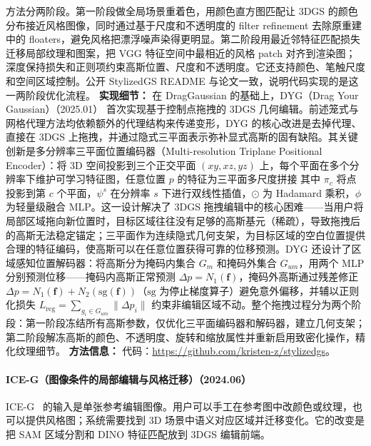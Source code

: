 方法分两阶段。第一阶段做全局场景重着色，用颜色直方图匹配让 3DGS 的颜色分布接近风格图像，同时通过基于尺度和不透明度的 filter refinement 去除原重建中的 floaters，避免风格把漂浮噪声染得更明显。第二阶段用最近邻特征匹配损失迁移局部纹理和图案，把 VGG 特征空间中最相近的风格 patch 对齐到渲染图；深度保持损失和正则项约束高斯位置、尺度和不透明度。它还支持颜色、笔触尺度和空间区域控制。公开 StylizedGS README 与论文一致，说明代码实现的是这一两阶段优化流程。
\textbf{实现细节：} 在 DragGaussian 的基础上，DYG（Drag Your Gaussian）（2025.01） 首次实现基于控制点拖拽的 3DGS 几何编辑。前述笼式与网格代理方法均依赖额外的代理结构来传递变形，DYG 的核心改进是去掉代理、直接在 3DGS 上拖拽，并通过隐式三平面表示弥补显式高斯的固有缺陷。其关键创新是多分辨率三平面位置编码器（Multi-resolution Triplane Positional Encoder）：将 3D 空间投影到三个正交平面 $(xy, xz, yz)$ 上，每个平面在多个分辨率下维护可学习特征图，任意位置 $p$ 的特征为三平面多尺度拼接 其中 $\pi_c$ 将点投影到第 $c$ 个平面，$\psi^s$ 在分辨率 $s$ 下进行双线性插值，$\odot$ 为 Hadamard 乘积，$\phi$ 为轻量级融合 MLP。这一设计解决了 3DGS 拖拽编辑中的核心困难——当用户将局部区域拖向新位置时，目标区域往往没有足够的高斯基元（稀疏），导致拖拽后的高斯无法稳定锚定；三平面作为连续隐式几何支架，为目标区域的空白位置提供合理的特征编码，使高斯可以在任意位置获得可靠的位移预测。DYG 还设计了区域感知位置解码器：将高斯分为掩码内集合 $G_m$ 和掩码外集合 $G_{um}$，用两个 MLP 分别预测位移——掩码内高斯正常预测 $\Delta p = N_1(\mathbf{f})$，掩码外高斯通过残差修正 $\Delta p = N_1(\mathbf{f}) + N_2(\mathrm{sg}(\mathbf{f}))$（$\mathrm{sg}$ 为停止梯度算子）避免意外偏移，并辅以正则化损失 $L_\mathrm{reg} = \sum_{g_i \in G_{um}} \|\Delta p_i\|$ 约束非编辑区域不动。整个拖拽过程分为两个阶段：第一阶段冻结所有高斯参数，仅优化三平面编码器和解码器，建立几何支架；第二阶段解冻高斯的颜色、不透明度、旋转和缩放属性并重新启用致密化操作，精化纹理细节。
\textbf{方法信息：} 代码：\url{https://github.com/kristen-z/stylizedgs}。
\paragraph{ICE-G（图像条件的局部编辑与风格迁移）（2024.06）}
ICE-G~\cite{2406_08488} 的输入是单张参考编辑图像。用户可以手工在参考图中改颜色或纹理，也可以提供风格图；系统需要找到 3D 场景中语义对应区域并迁移变化。它的改变是把 SAM 区域分割和 DINO 特征匹配放到 3DGS 编辑前端。

